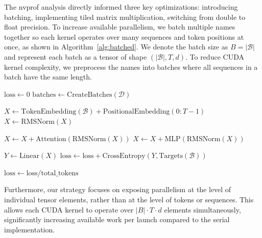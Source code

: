The nvprof analysis directly informed three key optimizations: introducing batching, implementing tiled matrix multiplication, switching from double to float precision. To increase available parallelism, we batch multiple names together so each kernel operates over many sequences and token positions at once, as shown in Algorithm~\ref{alg:batched}. 
We denote the batch size as $B = |\mathcal{B}|$ and represent each batch as a tensor of shape $(|\mathcal{B}|, T, d)$. To reduce CUDA kernel complexity, we preprocess the names into batches where all sequences in a batch have the same length.
\begin{algorithm}[H]
\caption{High-Level Batched Forward Pass}
\label{alg:batched}
\begin{algorithmic}
\State $\text{loss} \gets 0$
\State $\text{batches} \gets \text{CreateBatches}(\mathcal{D})$

    \State $X \gets \text{TokenEmbedding}(\mathcal{B}) + \text{PositionalEmbedding}(0{:}T-1)$
    \State $X \gets \text{RMSNorm}(X)$

        \State \textcolor{attncolor}{$X \gets X + \text{Attention}(\text{RMSNorm}(X))$} \textcolor{attncolor}{}
        \State \textcolor{mlpcolor}{$X \gets X + \text{MLP}(\text{RMSNorm}(X))$} 
    \EndFor

    \State $Y \gets \text{Linear}(X)$
    \State $\text{loss} \gets \text{loss} + \text{CrossEntropy}(Y, \text{Targets}(\mathcal{B}))$
\EndFor

\State $\text{loss} \gets \text{loss} / \text{total\_tokens}$
\end{algorithmic}
\end{algorithm}



Furthermore, our strategy focuses on exposing parallelism at the level of individual tensor elements, rather than at the level of tokens or sequences. This allows each CUDA kernel to operate over $|B| \cdot T \cdot d$ elements simultaneously, significantly increasing available work per launch compared to the serial implementation. 

